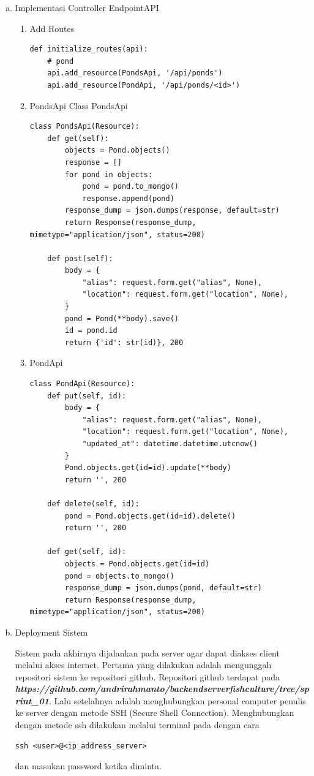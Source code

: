 \begin{enumerate}[a).]
	\item{Implementasi Controller EndpointAPI}
	
	\begin{enumerate}[1).]
		\item{Add Routes}
			\begin{lstlisting}
def initialize_routes(api):
    # pond
    api.add_resource(PondsApi, '/api/ponds')
    api.add_resource(PondApi, '/api/ponds/<id>')
			\end{lstlisting}
		\item{PondsApi}
			Class PondsApi
			\begin{lstlisting}
class PondsApi(Resource):
    def get(self):
        objects = Pond.objects()
        response = []
        for pond in objects:
            pond = pond.to_mongo()
            response.append(pond)
        response_dump = json.dumps(response, default=str)
        return Response(response_dump, mimetype="application/json", status=200)

    def post(self):
        body = {
            "alias": request.form.get("alias", None),
            "location": request.form.get("location", None),
        }
        pond = Pond(**body).save()
        id = pond.id
        return {'id': str(id)}, 200
    			\end{lstlisting}
		\item{PondApi}
			\begin{lstlisting}
class PondApi(Resource):
    def put(self, id):
        body = {
            "alias": request.form.get("alias", None),
            "location": request.form.get("location", None),
            "updated_at": datetime.datetime.utcnow()
        }
        Pond.objects.get(id=id).update(**body)
        return '', 200

    def delete(self, id):
        pond = Pond.objects.get(id=id).delete()
        return '', 200

    def get(self, id):
        objects = Pond.objects.get(id=id)
        pond = objects.to_mongo()
        response_dump = json.dumps(pond, default=str)
        return Response(response_dump, mimetype="application/json", status=200)
    			\end{lstlisting}
	\end{enumerate}
	
	\item{Deployment Sistem}
	
	Sistem pada akhirnya dijalankan pada server agar dapat diakses client melalui akses internet. Pertama yang dilakukan adalah mengunggah repositori sistem ke repositori github. Repositori github terdapat pada \textit{\textbf{https://github.com/andrirahmanto/backendserverfishculture/tree/sprint\_01}}. Lalu setelahnya adalah menghubungkan personal computer penulis ke server dengan metode SSH (Secure Shell Connection). Menghubungkan dengan metode ssh dilakukan melalui terminal pada dengan cara
\begin{lstlisting}
ssh <user>@<ip_address_server>
\end{lstlisting}
dan masukan password ketika diminta.


\end{enumerate}

